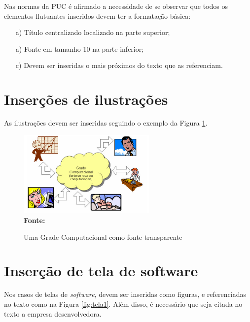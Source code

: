 Nas normas da PUC é afirmado a necessidade de se observar que todos os elementos flutuantes inseridos devem ter a formatação básica:

\begin{enumerate} 
 \item [a)] Título centralizado localizado na parte superior; 
 \item [a)] Fonte em tamanho 10 na parte inferior;
 \item [c)] Devem ser inseridas o mais próximos do texto que as referenciam.
\end{enumerate}


\section{\esp Inserções de ilustrações}

As ilustrações devem ser inseridas seguindo o exemplo da Figura \ref{fig:figura1}. 
\begin{figure}[ht]
	\centering	
	\caption[\hspace{0.1cm}Grade Computacional.]{Uma Grade Computacional como fonte transparente}
	\vspace{-0.4cm}
	\includegraphics[width=0.6\textwidth]{figuras/grade-comp.png}
	\\\textbf{\footnotesize Fonte:  }
	\label{fig:figura1}
\end{figure}
\vspace{-0.5cm}

\section{\esp Inserção de tela de software}

Nos casos de telas de \textit{software}, devem ser inseridas como figuras, e referenciadas no texto
como na Figura \ref{fig:tela1}. Além disso, é necessário que seja citada no texto a empresa desenvolvedora.

